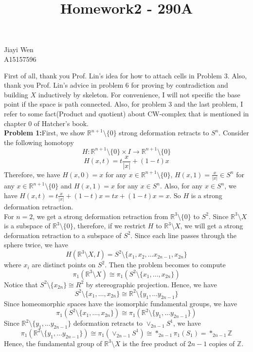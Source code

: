 \documentclass[12pt]{amsart}
\newcommand{\R}{\mathbb{R}}
\newcommand{\Z}{\mathbb{Z}}
\begin{document}
\title{Homework2 - 290A}
\maketitle
\begin{center}
    Jiayi Wen\\
    A15157596
\end{center}
First of all, thank you Prof. Lin's idea for how to attach cells in Problem 3. Also, thank you Prof. Lin's advice in problem 6 for proving by contradiction and building $X$ inductively by skeleton. For convenience, I will not specific the base point if the space is path connected. Also, for problem 3 and the last problem, I refer to some fact(Product and quotient) about CW-complex that is mentioned in chapter 0 of Hatcher's book.\\
\textbf{Problem 1:}First, we show $\R^{n+1}\setminus \{0\}$ strong deformation retracts to $S^n$. Consider the following homotopy
\[H:\R^{n+1}\setminus \{0\}\times I\to \R^{n+1}\setminus \{0\}\]
\[H(x,t)=t\frac{x}{|x|}+(1-t)x\]
Therefore, we have $H(x,0)=x$ for any $x\in\R^{n+1}\setminus \{0\}$, $H(x,1)=\frac{x}{|x|}\in S^n$ for any $x\in \R^{n+1}\setminus \{0\}$ and $H(x,1)=x$ for any $x\in S^n$. Also, for any $x\in S^n$, we have $H(x,t)=t\frac{x}{|x|}+(1-t)x=tx+(1-t)x=x$. So $H$ is a strong deformation retraction.\\
For $n=2$, we get a strong deformation retraction from $\R^3\setminus\{0\}$ to $S^2$. Since $\R^{3}\setminus X$ is a subspace of $\R^3\setminus \{0\}$, therefore, if we restrict $H$ to $\R^3\setminus X$, we will get a strong deformation retraction to a subspace of $S^2$. Since each line passes through the sphere twice, we have 
\[H(\R^3\setminus X,I)=S^2\setminus\{x_1,x_2,\dots x_{2n-1},x_{2n}\}\]
where $x_i$ are distinct points on $S^2$. Then the problem becomes to compute 
\[\pi_1(\R^3\setminus X)\cong \pi_1(S^2\setminus \{x_1,\dots, x_{2n}\})\]
Notice that $S^2\setminus\{x_{2n}\}\cong R^2$ by stereographic projection. Hence, we have 
\[S^2\setminus \{x_1,\dots, x_{2n}\}\cong \R^2\setminus\{y_1,\dots y_{2n-1}\}\]
Since homeomorphic spaces have the isomorphic fundamental groups, we have  $$\pi_1(S^2\setminus \{x_1,\dots, x_{2n}\})\cong \pi_1(\R^2\setminus\{y_1,\dots y_{2n-1}\})$$
Since $\R^2\setminus\{y_1,\dots y_{2n-1}\}$ deformation retracts to $\vee_{2n-1}S^1$, we have 
\[\pi_1(\R^2\setminus\{y_1,\dots y_{2n-1}\})\cong \pi_1(\vee_{2n-1}S^1)\cong \ast_{2n-1}\pi_1(S_1)=\ast_{2n-1}\Z\]
Hence, the fundamental group of $\R^3\setminus X$ is the free product of $2n-1$ copies of $\Z$.
\end{document}
